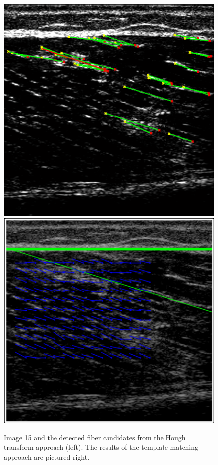 \documentclass[10pt,twocolumn,letterpaper]{article}
\begin{document}
\begin{figure}
	\begin{center}		
		\includegraphics[width=0.47\linewidth]{img/im15_hough_fibers}
		\includegraphics[width=0.47\linewidth]{img/im15_templ}
	\end{center}
	\caption{Image 15 and the detected fiber candidates from the Hough transform approach (left). The results of the template matching approach are pictured right.}
	\label{fig:im15_hough_fibers}	
\end{figure}
\end{document}
